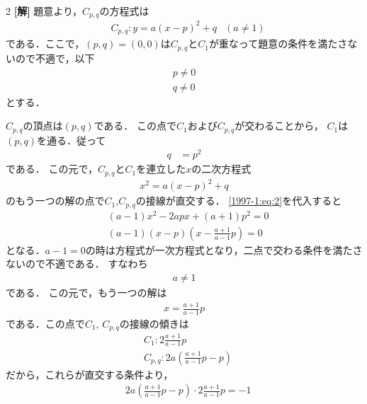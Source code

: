 \documentclass[../../../../main.tex]{subfiles}
\begin{document}
\setcounter{equation}{0}
\begin{oframed}
  
\end{oframed}
\setlength{\columnseprule}{0.4pt}
\begin{multicols}{2}
  {\bf[解]}
  題意より，$C_{p,q}$の方程式は
  \begin{align}
     & C_{p,q}: y=a(x-p)^2+q & (a \neq 1) \label{1997-1:eq:1}
  \end{align}
  である．ここで，$(p,q)=(0,0)$は$C_{p,q}$と$C_{1}$が重なって題意の条件を満たさないので不適で，以下
  \begin{align*}
    p \neq 0 \\
    q \neq 0
  \end{align*}
  とする．

  $C_{p,q}$の頂点は$(p,q)$である．
  この点で$C_1$および$C_{p,q}$が交わることから，
  $C_1$は$(p,q)$を通る．従って
  \begin{align}
    q & = p^2\label{1997-1:eq:2}
  \end{align}
  である．
  この元で，$C_{p,q}$と$C_{1}$を連立した$x$の二次方程式
  \begin{align*}
    x^2 = a(x-p)^2+q
  \end{align*}
  のもう一つの解の点で$C_1$,$C_{p,q}$の接線が直交する．
  \cref{1997-1:eq:2}を代入すると
  \begin{align*}
     & (a-1)x^2-2apx+(a+1)p^2 = 0                               \\
     & (a-1)\left(x-p\right)\left(x-\frac{a+1}{a-1}p\right) = 0
  \end{align*}
  となる．$a-1=0$の時は方程式が一次方程式となり，二点で交わる条件を満たさないので不適である．
  すなわち
  \begin{align}
    a \neq 1 \label{1997-1:eq:3}
  \end{align}
  である．
  この元で，もう一つの解は
  \begin{align*}
    x = \frac{a+1}{a-1}p
  \end{align*}
  である．この点で$C_1$, $C_{p,q}$の接線の傾きは
  \begin{align*}
     & C_1: 2\frac{a+1}{a-1}p                     \\
     & C_{p,q}: 2a\left(\frac{a+1}{a-1}p-p\right)
  \end{align*}
  だから，これらが直交する条件より，
  \begin{align*}
     & 2a\left(\frac{a+1}{a-1}p-p\right) \cdot 2\frac{a+1}{a-1}p = -1 \\

\end{align*}
\end{multicols}
\end{document}

